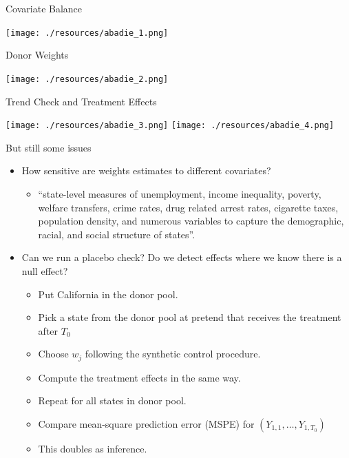 \begin{frame}{Covariate Balance}
\begin{center}
\texttt{[image: ./resources/abadie\_1.png]}
\end{center}
\end{frame}

\begin{frame}{Donor Weights}
\begin{center}
\texttt{[image: ./resources/abadie\_2.png]}
\end{center}
\end{frame}

\begin{frame}{Trend Check and Treatment Effects}
\begin{center}
\texttt{[image: ./resources/abadie\_3.png]}
\texttt{[image: ./resources/abadie\_4.png]}
\end{center}
\end{frame}

\begin{frame}{But still some issues}
\begin{itemize}
\item How sensitive are weights estimates to different covariates?
\begin{itemize}
\item ``state-level measures of unemployment, income inequality, poverty, welfare transfers, crime rates, drug related arrest rates, cigarette taxes, population density, and numerous variables to capture the demographic, racial, and social structure of states''.
\end{itemize}
\item Can we run a \alert{placebo check}? Do we detect effects where we know there is a null effect?
\begin{itemize}
\item Put California in the donor pool.
\item Pick a state from the donor pool at pretend that receives the treatment after $T_0$
\item Choose $w_j$ following the synthetic control procedure.
\item Compute the treatment effects in the same way.
\item Repeat for all states in donor pool.
\item Compare \alert{mean-square prediction error} (MSPE) for $(Y_{1,1},\ldots,Y_{1,T_0})$
\item This doubles as \alert{inference}.
\end{itemize}
\end{itemize}
\end{frame}



